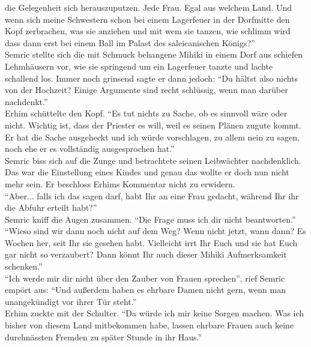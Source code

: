 die Gelegenheit sich herauszuputzen. Jede Frau. Egal aus welchem Land. Und wenn sich meine 
Schwestern schon bei einem Lagerfeuer in der Dorfmitte den Kopf zerbrachen, was sie anziehen und 
mit wem sie tanzen, wie schlimm wird dass dann erst bei einem Ball im Palast des saleicanischen 
Königs?''\\
Semric stellte sich die mit Schmuck behangene Mihiki in einem Dorf aus schiefen Lehmhäusern vor, 
wie sie springend um ein Lagerfeuer tanzte und lachte schallend los. Immer noch grinsend sagte er 
dann jedoch: ``Du hältst also nichts von der Hochzeit? Einige Argumente sind recht schlüssig, wenn 
man darüber nachdenkt.''\\
Erhim schüttelte den Kopf. ``Es tut nichts zu Sache, ob es sinnvoll wäre oder nicht. Wichtig ist, 
dass der Priester es will, weil es seinen Plänen zugute kommt. Er hat die Sache ausgeheckt und ich 
würde vorschlagen, zu allem nein zu sagen, noch ehe er es vollständig ausgesprochen hat.''\\
Semric biss sich auf die Zunge und betrachtete seinen Leibwächter nachdenklich. Das war die 
Einstellung eines Kindes und genau das wollte er doch nun nicht mehr sein. Er beschloss Erhims 
Kommentar nicht zu erwidern.\\
``Aber... falls ich das sagen darf, habt Ihr an eine Frau gedacht, während Ihr ihr die Abfuhr 
erteilt habt?''\\
Semric kniff die Augen zusammen. ``Die Frage muss ich dir nicht beantworten.''\\
``Wieso sind wir dann noch nicht auf dem Weg? Wenn nicht jetzt, wann dann? Es Wochen her, seit 
Ihr sie gesehen habt. Vielleicht irrt Ihr Euch und sie hat Euch gar nicht so verzaubert? Dann könnt 
Ihr auch dieser Mihiki Aufmerksamkeit schenken.''\\
``Ich werde mir dir nicht über den Zauber von Frauen sprechen'', rief Semric empört aus: ``Und 
außerdem haben es ehrbare Damen nicht gern, wenn man unangekündigt vor ihrer Tür steht.''\\
Erhim zuckte mit der Schulter. ``Da würde ich mir keine Sorgen machen. Was ich bisher  von diesem 
Land mitbekommen habe, lassen ehrbare Frauen auch keine durchnässten Fremden zu später Stunde in 
ihr Haus.''\\

